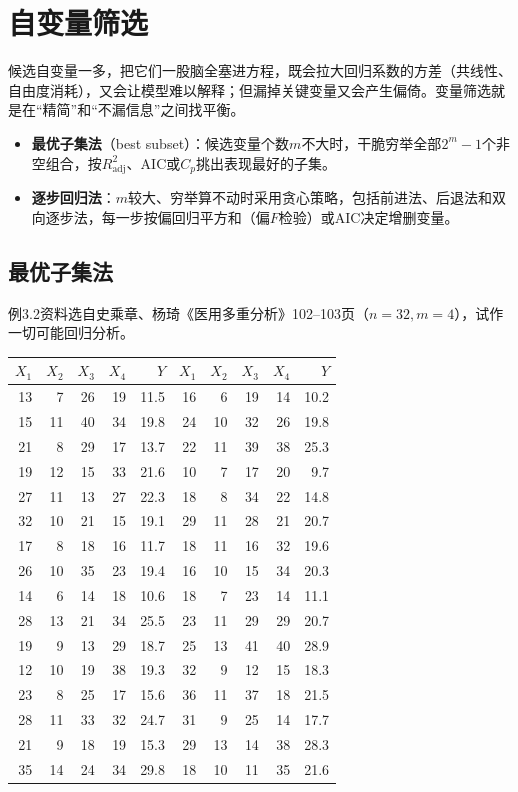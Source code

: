 \section{自变量筛选}\label{sec:select}
候选自变量一多，把它们一股脑全塞进方程，既会拉大回归系数的方差（共线性、自由度消耗），又会让模型难以解释；但漏掉关键变量又会产生偏倚。变量筛选就是在“精简”和“不漏信息”之间找平衡。
\begin{itemize}
\item \textbf{最优子集法}（best subset）：候选变量个数$m$不大时，干脆穷举全部$2^m-1$个非空组合，按$R_{\mathrm{adj}}^2$、AIC或$C_p$挑出表现最好的子集。
\item \textbf{逐步回归法}：$m$较大、穷举算不动时采用贪心策略，包括前进法、后退法和双向逐步法，每一步按偏回归平方和（偏$F$检验）或AIC决定增删变量。
\end{itemize}

\subsection{最优子集法}
例3.2资料选自史乘章、杨琦《医用多重分析》102--103页（$n=32,m=4$），试作一切可能回归分析。
\par\noindent\begin{minipage}{\linewidth}
\begin{center}\small\begin{tabular}{rrrrr@{\qquad}rrrrr}
\toprule $X_1$&$X_2$&$X_3$&$X_4$&$Y$&$X_1$&$X_2$&$X_3$&$X_4$&$Y$\\\midrule
13&7&26&19&11.5&16&6&19&14&10.2\\
15&11&40&34&19.8&24&10&32&26&19.8\\
21&8&29&17&13.7&22&11&39&38&25.3\\
19&12&15&33&21.6&10&7&17&20&9.7\\
27&11&13&27&22.3&18&8&34&22&14.8\\
32&10&21&15&19.1&29&11&28&21&20.7\\
17&8&18&16&11.7&18&11&16&32&19.6\\
26&10&35&23&19.4&16&10&15&34&20.3\\
14&6&14&18&10.6&18&7&23&14&11.1\\
28&13&21&34&25.5&23&11&29&29&20.7\\
19&9&13&29&18.7&25&13&41&40&28.9\\
12&10&19&38&19.3&32&9&12&15&18.3\\
23&8&25&17&15.6&36&11&37&18&21.5\\
28&11&33&32&24.7&31&9&25&14&17.7\\
21&9&18&19&15.3&29&13&14&38&28.3\\
35&14&24&34&29.8&18&10&11&35&21.6\\\bottomrule
\end{tabular}\end{center}
\end{minipage}\par\medskip

